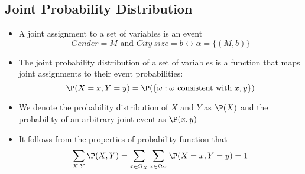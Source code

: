 \subsection{Joint Probability Distribution}
	\begin{frame}
		\begin{itemize}
			\item A joint assignment to a set of variables is an event
				\[ {Gender} = M \text{ and } {City\ size} = b \leftrightarrow \alpha = \{ ( M , b ) \} \]
			\item The joint probability distribution of a set of variables is a function that maps joint assignments to their event probabilities:
				\[ \P( X = x , Y = y ) = \P( \{ \omega : \omega \text{ consistent with } x, y  \} ) \]
			\item We denote the probability distribution of $X$ and $Y$ as $\P( X )$ and the probability of an arbitrary joint event as $\P( x , y )$
			\item It follows from the properties of probability function that
				\[ \sum_{X,Y} \P( X , Y ) = \sum_{x \in \Omega_X} \sum_{x \in \Omega_Y}\P( X = x , Y = y ) = 1 \]
		\end{itemize}
	\end{frame}